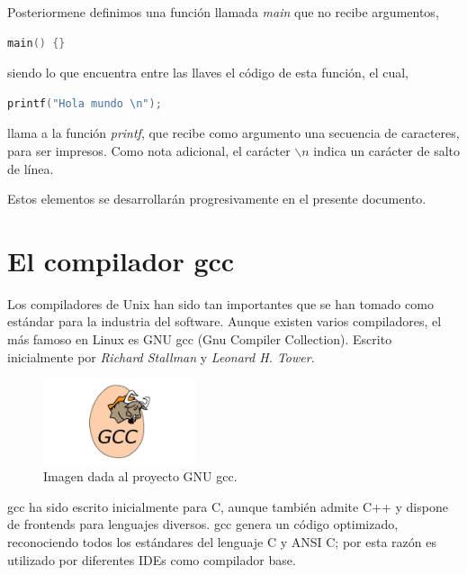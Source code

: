 \documentclass[a4paper, 11pt, titlepage]{article}
\begin{document}
    Posteriormene definimos una función llamada \textit{main} que no recibe argumentos,

    \begin{lstlisting}[language=C]
        main() {}\end{lstlisting}

    siendo lo que encuentra entre las llaves el código de esta función, el cual,
    
    \begin{lstlisting}[language=C]
        printf("Hola mundo \n");\end{lstlisting}

    llama a la función \textit{printf}, que recibe como argumento una secuencia de caracteres,
    para ser impresos. Como nota adicional, el carácter $\backslash n$ indica un carácter 
    de salto de línea.

    Estos elementos se desarrollarán progresivamente en el presente documento.
    

\section{El compilador gcc}\label{compilador}

    Los compiladores de Unix han sido tan importantes que se han tomado como estándar para la industria 
    del software. Aunque existen varios compiladores, el más famoso en Linux es GNU gcc (Gnu Compiler 
    Collection). Escrito inicialmente por \textit{Richard Stallman} y \textit{Leonard H. Tower}.

    \begin{figure}[htp]
        \centering
        \includegraphics[width=0.4\textwidth]{resources/gnu-gcc.png}
        \caption{Imagen dada al proyecto GNU gcc.}
        \label{gcclogo}
    \end{figure}

    gcc ha sido escrito inicialmente para C, aunque también admite C++ y dispone de frontends para 
    lenguajes diversos. gcc genera un código optimizado, reconociendo todos los estándares del lenguaje C
    y ANSI C; por esta razón es utilizado por diferentes IDEs como compilador base.
\end{document}

